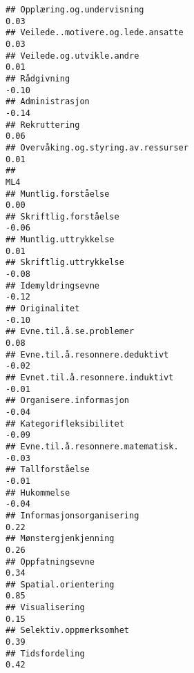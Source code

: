 \documentclass[
]{article}
\begin{document}
\begin{verbatim}
## Opplæring.og.undervisning                                                         0.03
## Veilede..motivere.og.lede.ansatte                                                 0.03
## Veilede.og.utvikle.andre                                                          0.01
## Rådgivning                                                                       -0.10
## Administrasjon                                                                   -0.14
## Rekruttering                                                                      0.06
## Overvåking.og.styring.av.ressurser                                                0.01
##                                                                                    ML4
## Muntlig.forståelse                                                                0.00
## Skriftlig.forståelse                                                             -0.06
## Muntlig.uttrykkelse                                                               0.01
## Skriftlig.uttrykkelse                                                            -0.08
## Idemyldringsevne                                                                 -0.12
## Originalitet                                                                     -0.10
## Evne.til.å.se.problemer                                                           0.08
## Evne.til.å.resonnere.deduktivt                                                   -0.02
## Evnet.til.å.resonnere.induktivt                                                  -0.01
## Organisere.informasjon                                                           -0.04
## Kategorifleksibilitet                                                            -0.09
## Evne.til.å.resonnere.matematisk.                                                 -0.03
## Tallforståelse                                                                   -0.01
## Hukommelse                                                                       -0.04
## Informasjonsorganisering                                                          0.22
## Mønstergjenkjenning                                                               0.26
## Oppfatningsevne                                                                   0.34
## Spatial.orientering                                                               0.85
## Visualisering                                                                     0.15
## Selektiv.oppmerksomhet                                                            0.39
## Tidsfordeling                                                                     0.42

\end{verbatim}
\end{document}
